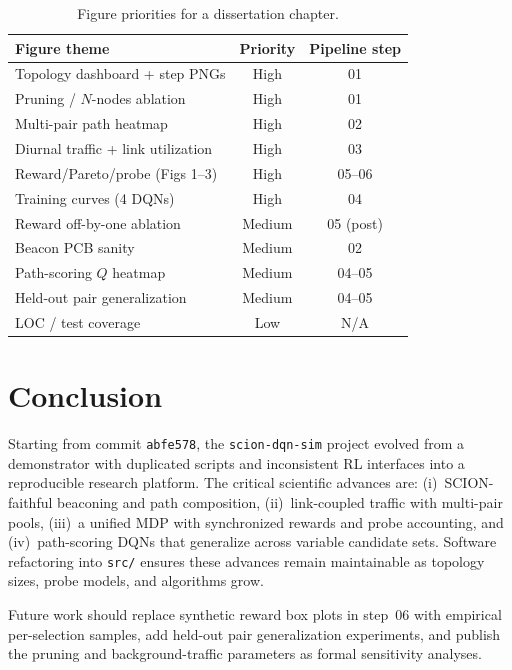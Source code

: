 \documentclass[11pt,a4paper,twoside,openright]{report}
\begin{document}
\begin{table}[htbp]
\centering
\caption{Figure priorities for a dissertation chapter.}
\label{tab:figure-priority}
\small
\begin{tabular}{@{}p{}cc@{}}
\toprule
Figure theme & Priority & Pipeline step \\
\midrule
Topology dashboard + step PNGs & High & 01 \\
Pruning / $N$-nodes ablation & High & 01 \\
Multi-pair path heatmap & High & 02 \\
Diurnal traffic + link utilization & High & 03 \\
Reward/Pareto/probe (Figs 1--3) & High & 05--06 \\
Training curves (4 DQNs) & High & 04 \\
Reward off-by-one ablation & Medium & 05 (post) \\
Beacon PCB sanity & Medium & 02 \\
Path-scoring $Q$ heatmap & Medium & 04--05 \\
Held-out pair generalization & Medium & 04--05 \\
LOC / test coverage & Low & N/A \\
\bottomrule
\end{tabular}
\end{table}

\chapter{Conclusion}

Starting from commit \texttt{abfe578}, the \texttt{scion-dqn-sim} project evolved from
a demonstrator with duplicated scripts and inconsistent RL interfaces into a
reproducible research platform.
The critical scientific advances are:
(i)~SCION-faithful beaconing and path composition,
(ii)~link-coupled traffic with multi-pair pools,
(iii)~a unified MDP with synchronized rewards and probe accounting, and
(iv)~path-scoring DQNs that generalize across variable candidate sets.
Software refactoring into \texttt{src/} ensures these advances remain maintainable
as topology sizes, probe models, and algorithms grow.

Future work should replace synthetic reward box plots in step~06 with empirical
per-selection samples, add held-out pair generalization experiments, and publish
the pruning and background-traffic parameters as formal sensitivity analyses.
\end{document}
